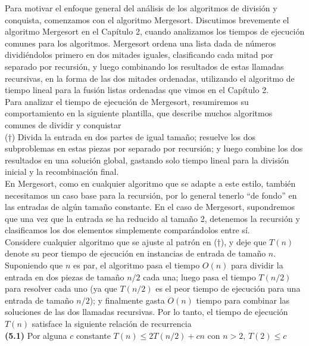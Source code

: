 \documentclass[a4paper, 12pt]{book}
\theoremstyle{dotless}
\begin{document}
Para motivar el enfoque general del análisis de los algoritmos de división y conquista, comenzamos con el algoritmo Mergesort. Discutimos brevemente el algoritmo Mergesort en el Capítulo 2, cuando analizamos los tiempos de ejecución comunes para los algoritmos. Mergesort ordena una lista dada de números dividiéndolos primero en dos mitades iguales, clasificando cada mitad por separado por recursión, y luego combinando los resultados de estas llamadas recursivas, en la forma de las dos mitades ordenadas, utilizando el algoritmo de tiempo lineal para la fusión listas ordenadas que vimos en el Capítulo 2.\\

Para analizar el tiempo de ejecución de Mergesort, resumiremos su comportamiento en la siguiente plantilla, que describe muchos algoritmos comunes de dividir y conquistar\\

(†) Divida la entrada en dos partes de igual tamaño; resuelve los dos subproblemas en estas piezas por separado por recursión; y luego combine los dos resultados en una solución global, gastando solo tiempo lineal para la división inicial y la recombinación final.\\


En Mergesort, como en cualquier algoritmo que se adapte a este estilo, también necesitamos un caso base para la recursión, por lo general tenerlo ``de fondo'' en las entradas de algún tamaño constante. En el caso de Mergesort, supondremos que una vez que la entrada se ha reducido al tamaño 2, detenemos la recursión y clasificamos los dos elementos simplemente comparándolos entre sí.\\

Considere cualquier algoritmo que se ajuste al patrón en (†), y deje que $T(n)$ denote su peor tiempo de ejecución en instancias de entrada de tamaño $n$. Suponiendo que $n$ es par, el algoritmo pasa el tiempo $O (n)$ para dividir la entrada en dos piezas de tamaño $n/2$ cada una; luego pasa el tiempo $T(n/2)$ para resolver cada uno (ya que $T(n/2)$ es el peor tiempo de ejecución para una entrada de tamaño $n/2$); y finalmente gasta $O(n)$ tiempo para combinar las soluciones de las dos llamadas recursivas. Por lo tanto, el tiempo de ejecución $T(n)$ satisface la siguiente relación de recurrencia\\

\textbf{(5.1)} Por alguna $c$ constante $T(n) ≤ 2T(n/2) + cn$ con $n>2$, $T(2) ≤ c$\\
\end{document}
